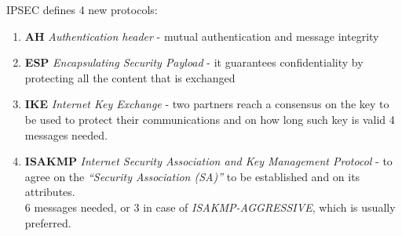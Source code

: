 IPSEC defines 4 new protocols:
\begin{enumerate}
   \item \textbf{AH} \textit{Authentication header }- mutual authentication and message integrity
   \item \textbf{ESP} \textit{Encapsulating Security Payload }- it guarantees confidentiality by protecting all the content that is exchanged
   \item \textbf{IKE} \textit{Internet Key Exchange }- two partners reach a consensus on the key to be used to protect their communications and on how long such key is valid
   4 messages needed.
   \item \textbf{ISAKMP} \textit{Internet Security Association and Key Management Protocol }- to agree on the \textit{“Security Association (SA)”} to be established and on its attributes.\\
   6 messages needed, or 3 in case of \textit{ISAKMP-AGGRESSIVE}, which is usually preferred.
\end{enumerate}


